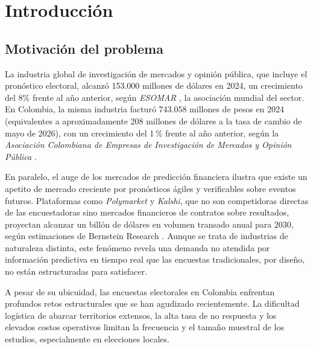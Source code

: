 

\chapter{Introducción}\label{ch:introduccion}

\section{Motivación del problema}


La industria global de investigación de mercados y opinión pública, que incluye el pronóstico electoral, alcanzó 153.000 millones de dólares en 2024, un crecimiento del 8\% frente al año anterior, según \textit{ESOMAR} \parencite{esomar2025}, la asociación mundial del sector. En Colombia, la misma industria facturó 743.058 millones de pesos en 2024 (equivalentes a aproximadamente 208 millones de dólares a la tasa de cambio de mayo de 2026), con un crecimiento del 1\,\% frente al año anterior, según la \textit{Asociación Colombiana de Empresas de Investigación de Mercados y Opinión Pública} \parencite{acei2024}. 

En paralelo, el auge de los mercados de predicción financiera ilustra que existe un apetito de mercado creciente por pronósticos ágiles y verificables sobre eventos futuros. Plataformas como \textit{Polymarket} y \textit{Kalshi}, que no son competidoras directas de las encuestadoras sino mercados financieros de contratos sobre resultados, proyectan alcanzar un billón de dólares en volumen transado anual para 2030, según estimaciones de Bernstein Research \parencite{bernstein2026}. Aunque se trata de industrias de naturaleza distinta, este fenómeno revela una demanda no atendida por información predictiva en tiempo real que las encuestas tradicionales, por diseño, no están estructuradas para satisfacer.

A pesar de su ubicuidad, las encuestas electorales en Colombia enfrentan profundos retos estructurales que se han agudizado recientemente. La dificultad logística de abarcar territorios extensos, la alta tasa de no respuesta y los elevados costos operativos limitan la frecuencia y el tamaño muestral de los estudios, especialmente en elecciones locales.

